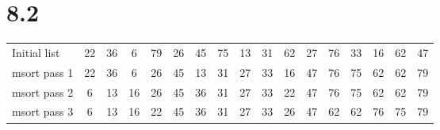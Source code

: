 \documentclass{article}
\begin{document}
                                                                                                                                                                                                                                                                                                                                                                        \section{8.2}
                                                                                                                                                                                                                                                                                                                                                                                \begin{tabular}{l*{15}{c}r}
                                                                                                                                                                                                                                                                                                                                                                                            Initial list & 22 & 36 & 6 & 79 & 26 & 45 & 75 & 13 & 31 & 62 & 27 & 76 & 33 & 16 & 62 & 47 \\
                                                                                                                                                                                                                                                                                                                                                                                                        msort pass 1 & 22 & 36 & 6 & 26 & 45 & 13 & 31 & 27 & 33 & 16 & 47 & 76 & 75 & 62 & 62 & 79 \\
                                                                                                                                                                                                                                                                                                                                                                                                                    msort pass 2 & 6 & 13 & 16 & 26 & 45 & 36 & 31 & 27 & 33 & 22 & 47 & 76 & 75 & 62 & 62 & 79 \\ 
                                                                                                                                                                                                                                                                                                                                                                                                                                msort pass 3 & 6 & 13 & 16 & 22 & 45 & 36 & 31 & 27 & 33 & 26 & 47 & 62 & 62 & 76 & 75 & 79 \\ 

\end{tabular}
\end{document}
